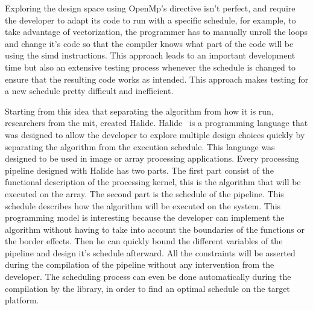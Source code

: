     Exploring the design space using OpenMp's directive isn't perfect, and require the developer to adapt its code to run with a specific schedule, for example, to take advantage of vectorization, the programmer has to manually unroll the loops and change it's code so that the compiler knows what part of the code will be using the \gls{simd} instructions. This approach leads to an important development time but also an extensive testing process whenever the schedule is changed to ensure that the resulting code works as intended. This approach makes testing for a new schedule pretty difficult and inefficient. 

    Starting from this idea that separating the algorithm from how it is run, researchers from the \gls{mit}, created Halide. 
    Halide~\cite{Art:Halide} is a programming language that was designed to allow the developer to explore multiple design choices quickly by separating the algorithm from the execution schedule. This language was designed to be used in image or array processing applications.
    Every processing pipeline designed with Halide has two parts. The first part consist of the functional description of the processing kernel, this is the algorithm that will be executed on the array. The second part is the schedule of the pipeline. This schedule describes how the algorithm will be executed on the system. This programming model is interesting because the developer can implement the algorithm without having to take into account the boundaries of the functions or the border effects. Then he can quickly bound the different variables of the pipeline and design it's schedule afterward. All the constraints will be asserted during the compilation of the pipeline without any intervention from the developer. The scheduling process can even be done automatically during the compilation by the library, in order to find an optimal schedule on the target platform.



